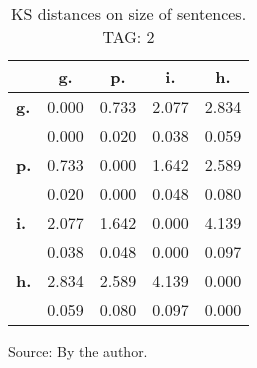 \begin{table}[h!]
\begin{center}
\caption{KS distances on size of sentences. TAG: 2}
\begin{tabular}{| l || c | c | c | c |}\hline
 & {\bf g.} & {\bf p.} & {\bf i.} & {\bf h.} \\\hline\hline
{\bf g.} & 0.000 & 0.733 & 2.077 & 2.834 \\
{\bf } & 0.000 & 0.020 & 0.038 & 0.059 \\\hline
{\bf p.} & 0.733 & 0.000 & 1.642 & 2.589 \\
{\bf } & 0.020 & 0.000 & 0.048 & 0.080 \\\hline
{\bf i.} & 2.077 & 1.642 & 0.000 & 4.139 \\
{\bf } & 0.038 & 0.048 & 0.000 & 0.097 \\\hline
{\bf h.} & 2.834 & 2.589 & 4.139 & 0.000 \\
{\bf } & 0.059 & 0.080 & 0.097 & 0.000 \\\hline
\end{tabular}
\begin{flushleft}
		Source: By the author.\
\end{flushleft}
\end{center}
\end{table}
